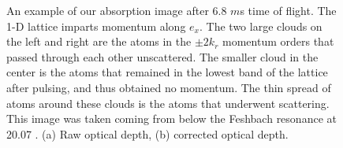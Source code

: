 \documentclass[12pt]{iopart}
\begin{document}
\begin{figure}
\caption{An example of our absorption image after 6.8 $m$s time of flight. The 1-D lattice imparts momentum along $e_x$. The two large clouds on the left and right are the atoms in the $\pm 2k_r$ momentum orders that passed through each other unscattered. The smaller cloud in the center is the atoms that remained in the lowest band of the lattice after pulsing, and thus obtained no momentum. The thin spread of atoms around these clouds is the atoms that underwent scattering.   This image was taken coming from below the Feshbach resonance at 20.07  \mT{}. (a) Raw optical depth, (b) corrected optical depth.}  
\label{fig:SampleCorrection}
\end{figure}
\end{document}
